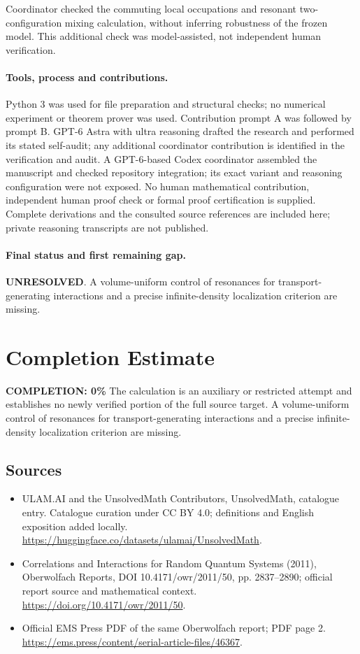 \documentclass[11pt]{article}
\begin{document}
Coordinator checked the commuting local occupations and resonant two-configuration mixing calculation, without inferring robustness of the frozen model. This additional check was model-assisted, not independent human verification.

\paragraph{Tools, process and contributions.}
Python 3 was used for file preparation and structural checks; no numerical experiment or theorem prover was used. Contribution prompt A was followed by prompt B. GPT-6 Astra with ultra reasoning drafted the research and performed its stated self-audit; any additional coordinator contribution is identified in the verification and audit. A GPT-6-based Codex coordinator assembled the manuscript and checked repository integration; its exact variant and reasoning configuration were not exposed. No human mathematical contribution, independent human proof check or formal proof certification is supplied. Complete derivations and the consulted source references are included here; private reasoning transcripts are not published.

\paragraph{Final status and first remaining gap.}
\textbf{UNRESOLVED}. A volume-uniform control of resonances for transport-generating interactions and a precise infinite-density localization criterion are missing.

\section{Completion Estimate}
\noindent\textbf{COMPLETION: 0\%}
The calculation is an auxiliary or restricted attempt and establishes no newly verified portion of the full source target. A volume-uniform control of resonances for transport-generating interactions and a precise infinite-density localization criterion are missing.

\subsection{Sources}
\begin{itemize}
\item[\hypertarget{source:statement:1}{S1}] ULAM.AI and the UnsolvedMath Contributors, UnsolvedMath, catalogue entry. Catalogue curation under CC BY 4.0; definitions and English exposition added locally.
\url{https://huggingface.co/datasets/ulamai/UnsolvedMath}.
\item[\hypertarget{source:statement:2}{S2}] Correlations and Interactions for Random Quantum Systems (2011), Oberwolfach Reports, DOI 10.4171/owr/2011/50, pp. 2837--2890; official report source and mathematical context.
\url{https://doi.org/10.4171/owr/2011/50}.
\item[\hypertarget{source:statement:3}{S3}] Official EMS Press PDF of the same Oberwolfach report; PDF page 2.
\url{https://ems.press/content/serial-article-files/46367}.
\end{itemize}
\label{end:statement}
\end{document}
